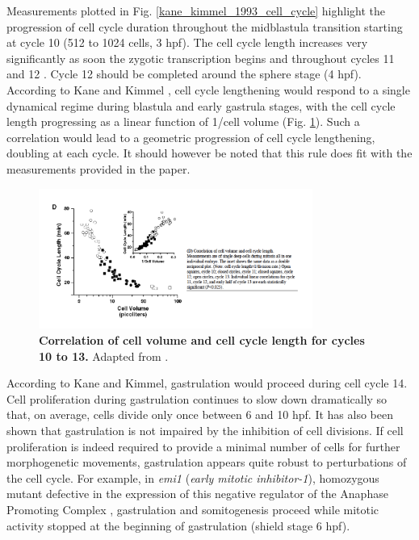 Measurements plotted in Fig. \ref{kane_kimmel_1993_cell_cycle} highlight the progression of cell cycle duration throughout the midblastula transition starting at cycle 10 (512 to 1024 cells, 3 hpf). The cell cycle length increases very significantly as soon the zygotic transcription begins and throughout cycles 11 and 12 \cite{Kane:1993wp}. Cycle 12 should be completed around the sphere stage (4 hpf). According to Kane and Kimmel \cite{Kane:1993wp}, cell cycle lengthening would respond to a single dynamical regime during blastula and early gastrula stages, with the cell cycle length progressing as a linear function of 1/cell volume (Fig. \ref{kane_kimmel_1993_cell_cycle_3}). Such a correlation would lead to a geometric progression of cell cycle lengthening, doubling at each cycle. It should however be noted that this rule does fit with the measurements provided in the paper.
\begin{figure}
\begin{center}
\includegraphics[width=0.8\textwidth]{../../images/Cases_Studies/Case_1_Division/kane_kimmel_1993_cell_cycle_3.png}
\end{center}
\caption{\textbf{Correlation of cell volume and cell cycle length for cycles 10 to 13. } Adapted from \cite{Kane:1993wp}.}
\label{kane_kimmel_1993_cell_cycle_3}
\end{figure}

According to Kane and Kimmel, gastrulation would proceed during cell cycle 14. Cell proliferation during gastrulation continues to slow down dramatically so that, on average, cells divide only once between 6 and 10 hpf. It has also been shown that gastrulation is not impaired by the inhibition of cell divisions. If cell proliferation is indeed required to provide a minimal number of cells for further morphogenetic movements, gastrulation appears quite robust to perturbations of the cell cycle. For example, in \textit{emi1} (\textit{early mitotic inhibitor-1}), homozygous mutant defective in the expression of this negative regulator of the Anaphase Promoting Complex \cite{Zhang:2008gw}, gastrulation and somitogenesis proceed while mitotic activity stopped at the beginning of gastrulation (shield stage 6 hpf).

